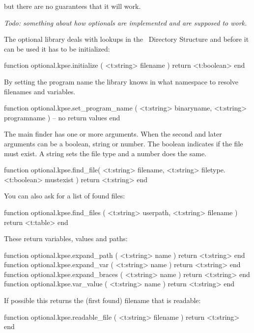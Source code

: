 but there are no guarantees that it will work.

\stopsubsection

\startsubsection[title=Management]

{\em Todo: something about how optionals are implemented and are supposed to work.}

\stopsubsection

\startsubsection[title=TDS (kpse)]

The optional  library deals with lookups in the \TEX\ Directory
Structure and before it can be used it has to be initialized:

\starttyping[option=LUA]
function optional.kpse.initialize ( <t:string> filename )
    return <t:boolean>
end
\stoptyping

By setting the program name the library knows in what namespace to resolve
filenames and variables.

\starttyping[option=LUA]
function optional.kpse.set_program_name (
    <t:string> binaryname,
    <t:string> programname
)
    -- no return values
end
\stoptyping

The main finder has one or more arguments. When the second and later arguments
can be a boolean, string or number. The boolean indicates if the file must exist.
A string sets the file type and a number does the same.

\starttyping[option=LUA]
function optional.kpse.find_file(
    <t:string>  filename,
    <t:string>  filetype.
    <t:boolean> mustexist
)
    return <t:string>
end
\stoptyping

You can also ask for a list of found files:

\starttyping[option=LUA]
function optional.kpse.find_files (
    <t:string> userpath,
    <t:string> filename
)
    return <t:table>
end
\stoptyping

These return variables, values and paths:

\starttyping[option=LUA]
function optional.kpse.expand_path   ( <t:string> name ) return <t:string> end
function optional.kpse.expand_var    ( <t:string> name ) return <t:string> end
function optional.kpse.expand_braces ( <t:string> name ) return <t:string> end
function optional.kpse.var_value     ( <t:string> name ) return <t:string> end
\stoptyping

If possible this returns the (first found) filename that is readable:

\starttyping[option=LUA]
function optional.kpse.readable_file ( <t:string> filename )
    return <t:string>
end
\stoptyping

